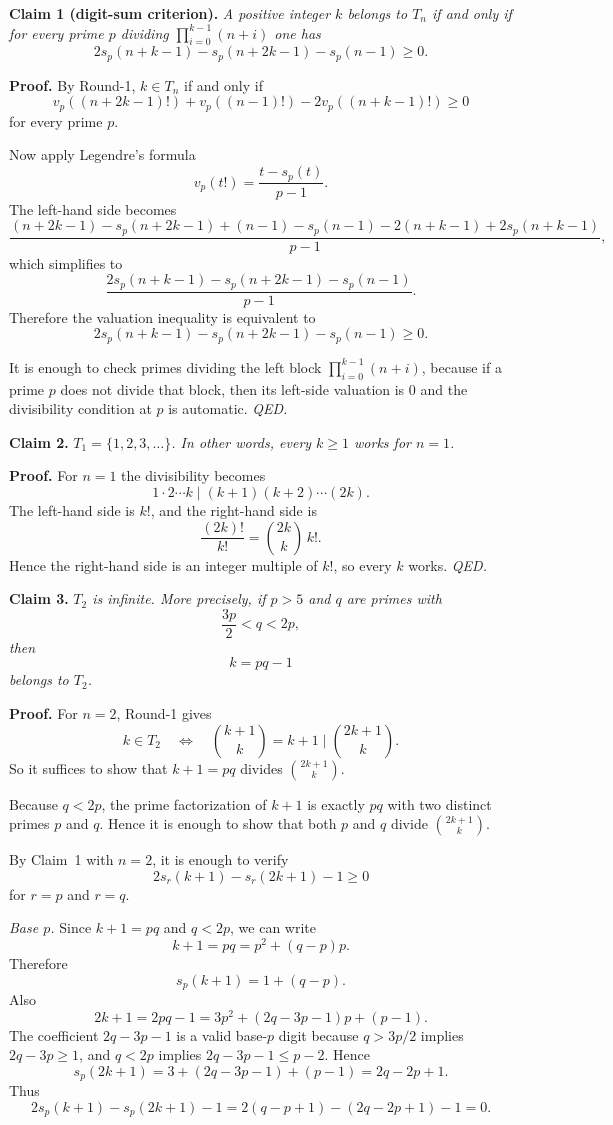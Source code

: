 \medskip
\noindent\textbf{Claim 1 (digit-sum criterion).}
\emph{A positive integer $k$ belongs to $T_n$ if and only if for every prime $p$ dividing $\prod_{i=0}^{k-1}(n+i)$ one has}
\[
2s_p(n+k-1)-s_p(n+2k-1)-s_p(n-1)\ge 0.
\]

\medskip
\noindent\textbf{Proof.}
By Round-1, $k\in T_n$ if and only if
\[
v_p\!\left((n+2k-1)!\right)+v_p\!\left((n-1)!\right)-2v_p\!\left((n+k-1)!\right)\ge 0
\]
for every prime $p$.

Now apply Legendre's formula
\[
v_p(t!)=\frac{t-s_p(t)}{p-1}.
\]
The left-hand side becomes
\[
\frac{(n+2k-1)-s_p(n+2k-1)+(n-1)-s_p(n-1)-2(n+k-1)+2s_p(n+k-1)}{p-1},
\]
which simplifies to
\[
\frac{2s_p(n+k-1)-s_p(n+2k-1)-s_p(n-1)}{p-1}.
\]
Therefore the valuation inequality is equivalent to
\[
2s_p(n+k-1)-s_p(n+2k-1)-s_p(n-1)\ge 0.
\]

It is enough to check primes dividing the left block $\prod_{i=0}^{k-1}(n+i)$, because if a prime $p$ does not divide that block, then its left-side valuation is $0$ and the divisibility condition at $p$ is automatic.
\hfill\textit{QED.}

\medskip
\noindent\textbf{Claim 2.}
\emph{$T_1=\{1,2,3,\dots\}$.  In other words, every $k\ge 1$ works for $n=1$.}

\medskip
\noindent\textbf{Proof.}
For $n=1$ the divisibility becomes
\[
1\cdot 2\cdots k \mid (k+1)(k+2)\cdots(2k).
\]
The left-hand side is $k!$, and the right-hand side is
\[
\frac{(2k)!}{k!}={2k\choose k}\,k!.
\]
Hence the right-hand side is an integer multiple of $k!$, so every $k$ works.
\hfill\textit{QED.}

\medskip
\noindent\textbf{Claim 3.}
\emph{$T_2$ is infinite.  More precisely, if $p>5$ and $q$ are primes with}
\[
\frac{3p}{2}<q<2p,
\]
\emph{then}
\[
k=pq-1
\]
\emph{belongs to $T_2$.}

\medskip
\noindent\textbf{Proof.}
For $n=2$, Round-1 gives
\[
k\in T_2
\quad\Leftrightarrow\quad
{k+1\choose k}=k+1\mid {2k+1\choose k}.
\]
So it suffices to show that $k+1=pq$ divides ${2k+1\choose k}$.

Because $q<2p$, the prime factorization of $k+1$ is exactly $pq$ with two distinct primes $p$ and $q$.
Hence it is enough to show that both $p$ and $q$ divide ${2k+1\choose k}$.

By Claim~1 with $n=2$, it is enough to verify
\[
2s_r(k+1)-s_r(2k+1)-1\ge 0
\]
for $r=p$ and $r=q$.

\smallskip
\noindent\emph{Base $p$.}
Since $k+1=pq$ and $q<2p$, we can write
\[
k+1=pq=p^2+(q-p)p.
\]
Therefore
\[
s_p(k+1)=1+(q-p).
\]
Also
\[
2k+1=2pq-1=3p^2+(2q-3p-1)p+(p-1).
\]
The coefficient $2q-3p-1$ is a valid base-$p$ digit because $q>3p/2$ implies $2q-3p\ge 1$, and $q<2p$ implies $2q-3p-1\le p-2$.
Hence
\[
s_p(2k+1)=3+(2q-3p-1)+(p-1)=2q-2p+1.
\]
Thus
\[
2s_p(k+1)-s_p(2k+1)-1
=2(q-p+1)-(2q-2p+1)-1=0.
\]

